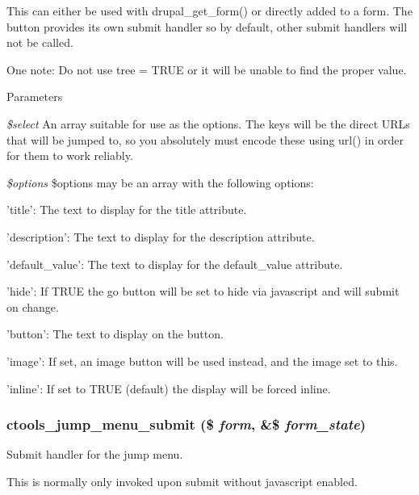 This can either be used with drupal\_\-get\_\-form() or directly added to a form. The button provides its own submit handler so by default, other submit handlers will not be called.

One note: Do not use tree = TRUE or it will be unable to find the proper value.





\begin{DoxyParams}{Parameters}
\item[{\em \$select}]An array suitable for use as the options. The keys will be the direct URLs that will be jumped to, so you absolutely must encode these using url() in order for them to work reliably.\item[{\em \$options}]\$options may be an array with the following options:
\begin{DoxyItemize}
\item 'title': The text to display for the title attribute.
\item 'description': The text to display for the description attribute.
\item 'default\_\-value': The text to display for the default\_\-value attribute.
\item 'hide': If TRUE the go button will be set to hide via javascript and will submit on change.
\item 'button': The text to display on the button.
\item 'image': If set, an image button will be used instead, and the image set to this.
\item 'inline': If set to TRUE (default) the display will be forced inline. 
\end{DoxyItemize}\end{DoxyParams}
\hypertarget{jump-menu_8inc_a68fece12f8d911934a1ffb41f0e30188}{
\subsubsection[{ctools\_\-jump\_\-menu\_\-submit}]{\setlength{\rightskip}{0pt plus 5cm}ctools\_\-jump\_\-menu\_\-submit (\$ {\em form}, \/  \&\$ {\em form\_\-state})}}
\label{jump-menu_8inc_a68fece12f8d911934a1ffb41f0e30188}
Submit handler for the jump menu.

This is normally only invoked upon submit without javascript enabled. 
